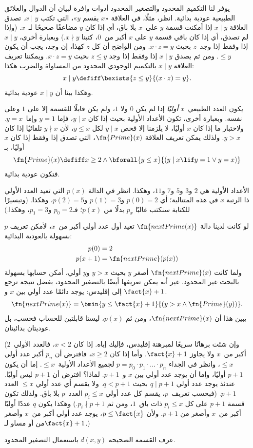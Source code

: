 \documentclass[../../../include/open-logic-section]{subfiles}
\begin{document}

يوفر لنا التكميم المحدود والتصغير المحدود أدوات وافرة لبيان أن الدوال
والعلائق الطبيعية عودية بدائية. انظر، مثلًا، في العلاقة «$x$ يقسم
$y$»، التي تكتب $x\mid y$. تصدق العلاقة $x\mid y$ إذا أمكنت قسمة
$y$ على~$x$ بلا باق، أي إذا كان $y$ مضاعفًا صحيحًا لـ~$x$. (وإذا لم
تصدق، أي إذا كان باقي قسمة $y$ على $x$ أكبر من~$0$، كتبنا
$x\nmid y$.) وبعبارة أخرى، $x\mid y$ إذا وفقط إذا وجد~$z$ بحيث
$x\cdot z=y$. ومن الواضح أن كل $z$ كهذا، إن وجد، يجب أن يكون
$\leq y$. ومن ثم يصدق $x\mid y$ إذا وفقط إذا وجد $z\le y$ بحيث
$x\cdot z=y$. ويمكننا تعريف العلاقة $x\mid y$ بالتكميم الوجودي
المحدود من المساواة والضرب هكذا:
\[
x \mid y \defiff \bexists{z \leq y}{(x \cdot z) = y}.
\]
وهكذا بينا أن $x\mid y$ عودية بدائية.

يكون العدد الطبيعي~$x$ \emph{أوليًا} إذا لم يكن $0$ ولا $1$، ولم
يكن قابلًا للقسمة إلا على $1$ وعلى نفسه. وبعبارة أخرى، تكون الأعداد
الأولية بحيث إذا كان $y\mid x$، فإما $y=1$ وإما~$y=x$. ولاختبار ما
إذا كان $x$ أوليًا، لا يلزمنا إلا فحص $y\mid x$ لكل $y\le x$، لأن
$y\nmid x$ تلقائيًا إذا كان $y>x$. ولذلك يمكن تعريف العلاقة
$\fn{Prime}(x)$، التي تصدق إذا وفقط إذا كان $x$ أوليًا، بـ
\[
\fn{Prime}(x) \defiff x \geq 2 \land \bforall{y \leq x}{(y \mid x \lif y
  = 1 \lor y = x)}
\]
فتكون عودية بدائية.

الأعداد الأولية هي $2$ و$3$ و$5$ و$7$ و$11$، وهكذا. انظر في الدالة
$p(x)$ التي تعيد العدد الأولي ذا الرتبة $x$ في هذه المتتالية؛ أي
$p(0)=2$ و$p(1)=3$ و$p(2)=5$، وهكذا. (وتيسيرًا للكتابة سنكتب غالبًا
$p_x$ بدلًا من $p(x)$؛ فـ$p_0=2$ و$p_1=3$، وهكذا.)

لو كانت لدينا دالة $\fn{nextPrime(x)}$ تعيد أول عدد أولي أكبر من~$x$،
لأمكن تعريف $p$ بسهولة بالعودية البدائية:
\begin{align*}
  p(0) & = 2\\
  p(x+1) & = \fn{nextPrime}(p(x))
\end{align*}
ولما كانت $\fn{nextPrime}(x)$ أصغر $y$ بحيث $y>x$ و$y$ أولي، أمكن
حسابها بسهولة بالبحث غير المحدود. غير أنه يمكن تعريفها أيضًا بالتصغير
المحدود، بفضل نتيجة ترجع إلى إقليدس: يوجد دائمًا عدد أولي بين $x$ و
$\fact{x}+1$.
\[
  \fn{nextPrime(x)} =
  \bmin{y \leq \fact{x}+1}{(y > x \land \fn{Prime}(y))}.
\]
يبين هذا أن $\fn{nextPrime}(x)$، ومن ثم $p(x)$، ليستا قابلتين للحساب
فحسب، بل عوديتان بدائيتان.

(وإن شئت برهانًا سريعًا لمبرهنة إقليدس، فإليك إياه. إذا كان $x<2$،
فالعدد الأولي~$2$ أكبر من~$x$ ولا يجاوز $\fact{x}+1$. وأما إذا كان
$x\geq2$، فافترض أن $p_n$ أكبر عدد أولي $\le x$، وانظر في الجداء
$p=p_0\cdot p_1\cdot\dots\cdot p_n$ لجميع الأعداد الأولية~$\le x$.
إما أن يكون $p+1$ أوليًا، وإما أن يوجد عدد أولي بين $x$ و~$p+1$.
لماذا؟ افترض أن $p+1$ ليس أوليًا. عندئذ يوجد عدد أولي $q\mid p+1$
بحيث $q<p+1$. ولا يقسم أي عدد أولي $\le x$ العدد $p+1$. (فبحسب
تعريف~$p$، يقسم كل عدد أولي $p_i\le x$ العدد~$p$ بلا باق. ولذلك تكون
قسمة $p+1$ على كل $p_i\le x$ ذات باق~$1$، ومن ثم
$p_i\nmid p+1$.) وهكذا يكون $q$ عددًا أوليًا أكبر من~$x$ وأصغر من
$p+1$. ولأن $p\le\fact{x}$، يوجد عدد أولي أكبر من~$x$ وأصغر من أو
مساو لـ$\fact{x}+1$.)

\begin{prob}
عرف القسمة الصحيحة $d(x,y)$ باستعمال التصغير المحدود.
\end{prob}
\end{document}
